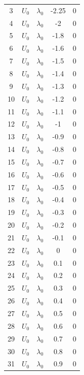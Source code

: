 \documentclass[12pt,letterpaper]{scrreprt}
\begin{document}
\begin{appendices}
\begin{table}[!ht]
{\begin{tabular}{c|c|c|c|c}
3   & $U_0$        & $\lambda_0$ & -2.25 & 0   \\
4   & $U_0$        & $\lambda_0$ & -2    & 0   \\
5   & $U_0$        & $\lambda_0$ & -1.8  & 0   \\
6   & $U_0$        & $\lambda_0$ & -1.6  & 0   \\
7   & $U_0$        & $\lambda_0$ & -1.5  & 0   \\
8   & $U_0$        & $\lambda_0$ & -1.4  & 0   \\
9   & $U_0$        & $\lambda_0$ & -1.3  & 0   \\
10  & $U_0$        & $\lambda_0$ & -1.2  & 0   \\
11  & $U_0$        & $\lambda_0$ & -1.1  & 0   \\
12  & $U_0$        & $\lambda_0$ & -1    & 0   \\
13  & $U_0$        & $\lambda_0$ & -0.9  & 0   \\
14  & $U_0$        & $\lambda_0$ & -0.8  & 0   \\
15  & $U_0$        & $\lambda_0$ & -0.7  & 0   \\
16  & $U_0$        & $\lambda_0$ & -0.6  & 0   \\
17  & $U_0$        & $\lambda_0$ & -0.5  & 0   \\
18  & $U_0$        & $\lambda_0$ & -0.4  & 0   \\
19  & $U_0$        & $\lambda_0$ & -0.3  & 0   \\
20  & $U_0$        & $\lambda_0$ & -0.2  & 0   \\
21  & $U_0$        & $\lambda_0$ & -0.1  & 0   \\
22  & $U_0$        & $\lambda_0$ & 0     & 0   \\
23  & $U_0$        & $\lambda_0$ & 0.1   & 0   \\
24  & $U_0$        & $\lambda_0$ & 0.2   & 0   \\
25  & $U_0$        & $\lambda_0$ & 0.3   & 0   \\
26  & $U_0$        & $\lambda_0$ & 0.4   & 0   \\
27  & $U_0$        & $\lambda_0$ & 0.5   & 0   \\
28  & $U_0$        & $\lambda_0$ & 0.6   & 0   \\
29  & $U_0$        & $\lambda_0$ & 0.7   & 0   \\
30  & $U_0$        & $\lambda_0$ & 0.8   & 0   \\
31  & $U_0$        & $\lambda_0$ & 0.9   & 0   \\

\end{tabular}}
\end{table}
\end{appendices}
\end{document}
